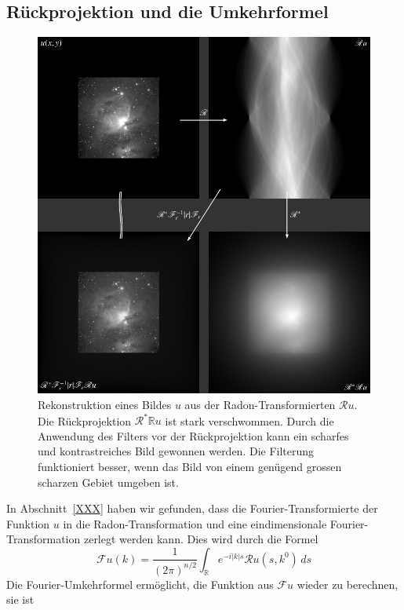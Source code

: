 \subsection{Rückprojektion und die Umkehrformel}
\begin{figure}
\centering
\includegraphics[width=\textwidth]{chapters/050-radon/images/orion2.pdf}
\caption{Rekonstruktion eines Bildes $u$ aus der Radon-Transformierten
$\mathscr{R}u$.
Die Rückprojektion $\mathscr{R}^*\mathbb{R}u$ ist stark verschwommen.
Durch die Anwendung des Filters vor der Rückprojektion kann ein
scharfes und kontrastreiches Bild gewonnen werden.
Die Filterung funktioniert besser, wenn das Bild von einem genügend 
grossen scharzen Gebiet umgeben ist.
\label{buch:radon:rueckprojektion:fig:rueckprojektion}}
\end{figure}
In Abschnitt~\ref{XXX}
haben wir gefunden, dass die Fourier-Transformierte der Funktion $u$
in die Radon-Transformation und eine eindimensionale Fourier-Transformation
zerlegt werden kann.
Dies wird durch die Formel
\[
\mathscr{F}u(k)
=
\frac{1}{(2\pi)^{n/2}}
\int_{\mathbb{R}} 
e^{-i|k|s}
\mathscr{R}u(s,k^0)\,ds
\]
Die Fourier-Umkehrformel ermöglicht, die Funktion aus $\mathscr{F}u$ 
wieder zu berechnen, sie ist
